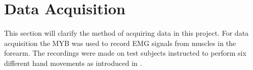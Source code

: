 \section{Data Acquisition} \label{sec:M:dataAcquisition}

This section will clarify the method of acquiring data in this project. For data acquisition the MYB was used to record EMG signals from muscles in the forearm. The recordings were made on test subjects instructed to perform six different hand movements as introduced in . 



